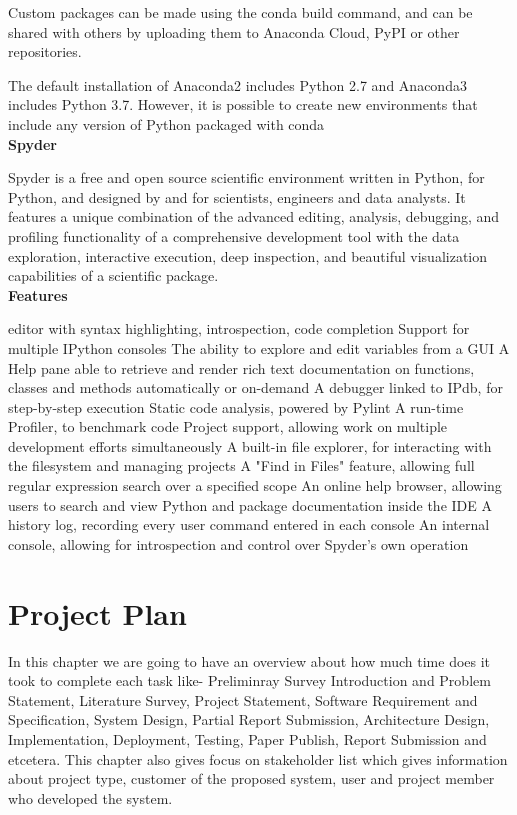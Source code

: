\documentclass[oneside,a4paper,12pt]{report}
\begin{document}
Custom packages can be made using the conda build command, and can be shared with others by uploading them to Anaconda Cloud, PyPI or other repositories.

The default installation of Anaconda2 includes Python 2.7 and Anaconda3 includes Python 3.7. However, it is possible to create new environments that include any version of Python packaged with conda\\

\newpage 
\textbf{Spyder}

Spyder is a free and open source scientific environment written in Python, for Python, and designed by and for scientists, engineers and data analysts. It features a unique combination of the advanced editing, analysis, debugging, and profiling functionality of a comprehensive development tool with the data exploration, interactive execution, deep inspection, and beautiful visualization capabilities of a scientific package. \\
\textbf{Features}\\
\begin{itemize}
    \itemAn editor with syntax highlighting, introspection, code completion
Support for multiple IPython consoles
The ability to explore and edit variables from a GUI
A Help pane able to retrieve and render rich text documentation on functions, classes and methods automatically or on-demand
A debugger linked to IPdb, for step-by-step execution
Static code analysis, powered by Pylint
A run-time Profiler, to benchmark code
Project support, allowing work on multiple development efforts simultaneously
A built-in file explorer, for interacting with the filesystem and managing projects
A "Find in Files" feature, allowing full regular expression search over a specified scope
An online help browser, allowing users to search and view Python and package documentation inside the IDE
A history log, recording every user command entered in each console
An internal console, allowing for introspection and control over Spyder's own operation\\
\end{itemize}

\chapter{Project Plan}

In this chapter we are going to have an overview about how much time does it took to complete each task like- Preliminray Survey Introduction and Problem Statement, Literature
Survey, Project Statement, Software Requirement and Specification, System Design, Partial
Report Submission, Architecture Design, Implementation, Deployment, Testing, Paper Publish, Report Submission and etcetera. This chapter also gives focus on stakeholder list which
gives information about project type, customer of the proposed system, user and project
member who developed the system.\\
\end{document}

